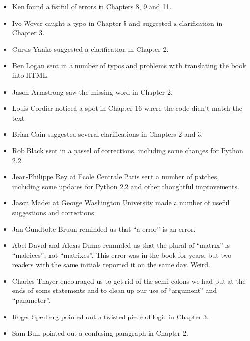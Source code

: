 \documentclass[10pt]{book}
\begin{document}
\begin{itemize}
\item Ken found a fistful of errors in Chapters 8, 9 and 11.

\item Ivo Wever caught a typo in Chapter 5 and suggested a clarification
in Chapter 3.

\item Curtis Yanko suggested a clarification in Chapter 2.

\item Ben Logan sent in a number of typos and problems with translating
the book into HTML.

\item Jason Armstrong saw the missing word in Chapter 2.

\item Louis Cordier noticed a spot in Chapter 16 where the code
didn't match the text.

\item Brian Cain suggested several clarifications in Chapters 2 and 3.

\item Rob Black sent in a passel of corrections, including some
changes for Python 2.2.

\item Jean-Philippe Rey at Ecole Centrale
Paris sent a number of patches, including some updates for Python 2.2
and other thoughtful improvements.

\item Jason Mader at George Washington University made a number
of useful suggestions and corrections.

\item Jan Gundtofte-Bruun reminded us that ``a error'' is an error.

\item Abel David and Alexis Dinno reminded us that the plural of
``matrix'' is ``matrices'', not ``matrixes''.  This error was in the
book for years, but two readers with the same initials reported it on
the same day.  Weird.

\item Charles Thayer encouraged us to get rid of the semi-colons
we had put at the ends of some statements and to clean up our
use of ``argument'' and ``parameter''.

\item Roger Sperberg pointed out a twisted piece of logic in Chapter 3.

\item Sam Bull pointed out a confusing paragraph in Chapter 2.


\end{itemize}
\end{document}
